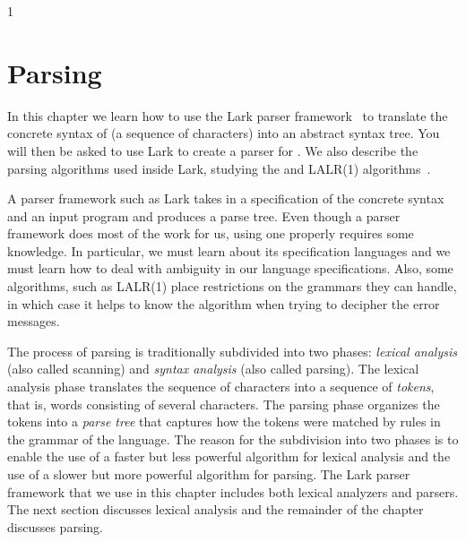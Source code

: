 \documentclass[7x10]{TimesAPriori_MIT}%
\def\pythonEd{1}
\def\edition{1}
\newcommand{\pythonColor}[0]{}
\numberwithin{theorem}{chapter}
\numberwithin{definition}{chapter}
\numberwithin{equation}{chapter}
\begin{document}
{\if\edition\pythonEd\pythonColor
\chapter{Parsing}
\label{ch:parsing}
\setcounter{footnote}{0}

In this chapter we learn how to use the Lark parser
framework~\citep{shinan20:_lark_docs} to translate the concrete syntax
of \LangInt{} (a sequence of characters) into an abstract syntax tree.
You will then be asked to use Lark to create a parser for \LangVar{}.
We also describe the parsing algorithms used inside Lark, studying the
\citet{Earley:1970ly} and LALR(1) algorithms~\citep{DeRemer69,Anderson73}.

A parser framework such as Lark takes in a specification of the
concrete syntax and an input program and produces a parse tree. Even
though a parser framework does most of the work for us, using one
properly requires some knowledge.  In particular, we must learn about
its specification languages and we must learn how to deal with
ambiguity in our language specifications. Also, some algorithms, such
as LALR(1) place restrictions on the grammars they can handle, in
which case it helps to know the algorithm when trying to decipher the
error messages.

The process of parsing is traditionally subdivided into two phases:
\emph{lexical analysis} (also called scanning) and \emph{syntax
  analysis} (also called parsing). The lexical analysis phase
translates the sequence of characters into a sequence of
\emph{tokens}, that is, words consisting of several characters. The
parsing phase organizes the tokens into a \emph{parse tree} that
captures how the tokens were matched by rules in the grammar of the
language. The reason for the subdivision into two phases is to enable
the use of a faster but less powerful algorithm for lexical analysis
and the use of a slower but more powerful algorithm for parsing.
%
%
The Lark parser framework that we use in this chapter includes both
lexical analyzers and parsers. The next section discusses lexical
analysis and the remainder of the chapter discusses parsing.


}
\end{document}
